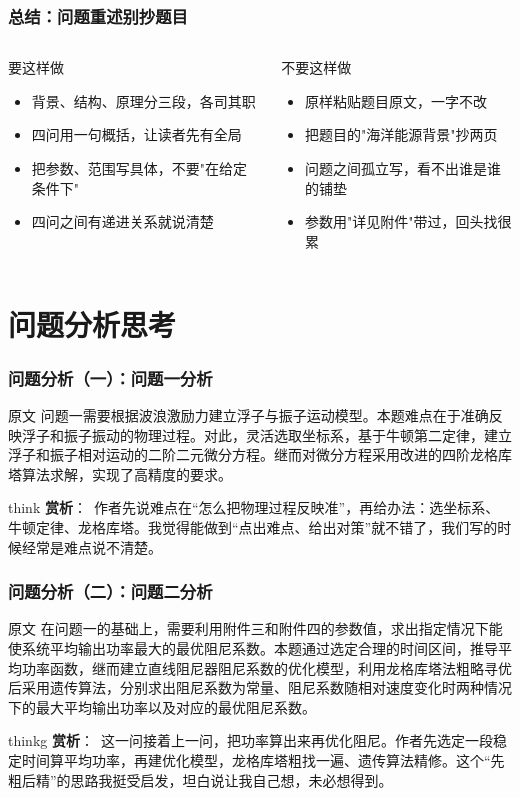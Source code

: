 \documentclass[aspectratio=169]{beamer}
\newcommand{\remark}[2]{%
	\vspace{0.12cm}%
	\begin{beamercolorbox}[rounded=true,sep=6pt]{think}%
		{\color{orchidpurple}\textbf{#1}：}~#2%
	\end{beamercolorbox}%
}
\newcommand{\remarkg}[2]{%
	\vspace{0.12cm}%
	\begin{beamercolorbox}[rounded=true,sep=6pt]{thinkg}%
		{\color{orchidgold}\textbf{#1}：}~#2%
	\end{beamercolorbox}%
}
\begin{document}
\begin{frame}
	\frametitle{总结：问题重述别抄题目}
	\scriptsize
	\begin{columns}[T]
		\begin{exampleblock}{要这样做}
			\begin{itemize}
				\item 背景、结构、原理分三段，各司其职
				\item 四问用一句概括，让读者先有全局
				\item 把参数、范围写具体，不要"在给定条件下"
				\item 四问之间有递进关系就说清楚
			\end{itemize}
		\end{exampleblock}
		\begin{alertblock}{不要这样做}
			\begin{itemize}
				\item 原样粘贴题目原文，一字不改
				\item 把题目的"海洋能源背景"抄两页
				\item 问题之间孤立写，看不出谁是谁的铺垫
				\item 参数用"详见附件"带过，回头找很累
			\end{itemize}
		\end{alertblock}
	\end{columns}

\end{frame}

\section{问题分析思考}
\begin{frame}
	\frametitle{问题分析（一）：问题一分析}
	\scriptsize
	\begin{block}{原文}
		问题一需要根据波浪激励力建立浮子与振子运动模型。本题难点在于准确反映浮子和振子振动的物理过程。对此，灵活选取坐标系，基于牛顿第二定律，建立浮子和振子相对运动的二阶二元微分方程。继而对微分方程采用改进的四阶龙格库塔算法求解，实现了高精度的要求。
	\end{block}
	\medskip
	\remark{赏析}{作者先说难点在``怎么把物理过程反映准''，再给办法：选坐标系、牛顿定律、龙格库塔。我觉得能做到``点出难点、给出对策''就不错了，我们写的时候经常是难点说不清楚。}
\end{frame}

\begin{frame}
	\frametitle{问题分析（二）：问题二分析}
	\scriptsize
	\begin{block}{原文}
		在问题一的基础上，需要利用附件三和附件四的参数值，求出指定情况下能使系统平均输出功率最大的最优阻尼系数。本题通过选定合理的时间区间，推导平均功率函数，继而建立直线阻尼器阻尼系数的优化模型，利用龙格库塔法粗略寻优后采用遗传算法，分别求出阻尼系数为常量、阻尼系数随相对速度变化时两种情况下的最大平均输出功率以及对应的最优阻尼系数。
	\end{block}
	\medskip
	\remarkg{赏析}{这一问接着上一问，把功率算出来再优化阻尼。作者先选定一段稳定时间算平均功率，再建优化模型，龙格库塔粗找一遍、遗传算法精修。这个``先粗后精''的思路我挺受启发，坦白说让我自己想，未必想得到。}
\end{frame}
\end{document}
